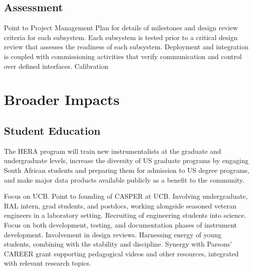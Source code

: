 \documentclass[preprint]{aastex}
\begin{document}
\subsection{Assessment}

Point to Project Management Plan for details of milestones and design review criteria for each subsystem.
Each subsystem is tested prior to a critical design review that assesses the readiness of each subsystem.
Deployment and integration is coupled with commissioning activities that verify communication and control over defined interfaces.
Calibration 



\section{Broader Impacts} %


\subsection{Student Education}

The HERA program will train new instrumentalists at the graduate and undergraduate levels, increase the
diversity of US graduate programs by engaging South African students and preparing them for admission to US degree programs, and make major data products available publicly as a benefit to the community.

Focus on UCB. 
Point to founding of CASPER at UCB.
Involving undergraduate, RAL intern, grad students, and postdocs, working alongside seasoned veteran engineers in a laboratory setting.
Recruiting of engineering students into science.
Focus on both development, testing, and documentation phases of instrument development.  
Involvement in design reviews.
Harnessing energy of young students, combining with the stability and discipline.
Synergy with Parsons' CAREER grant supporting pedagogical videos and other resources, integrated with relevant
research topics.
\end{document}
